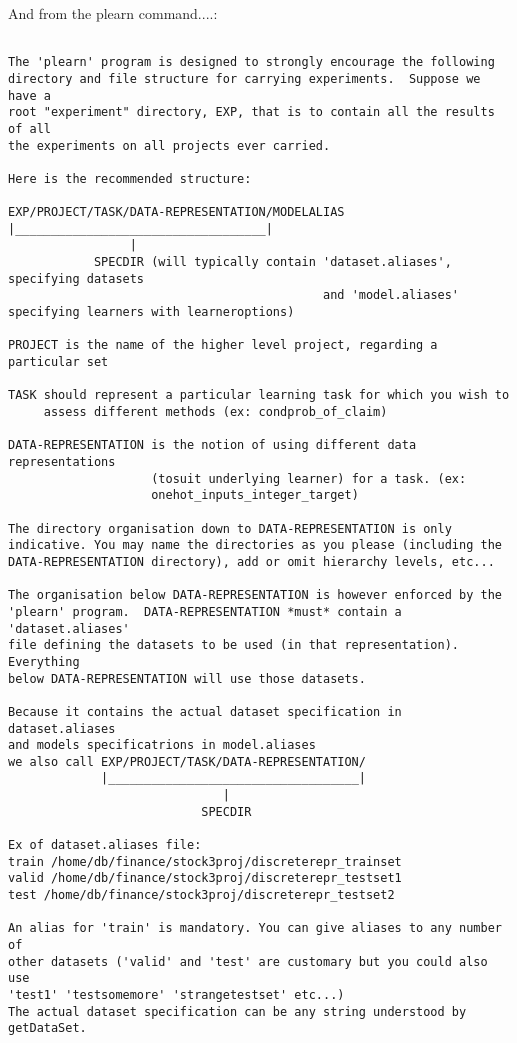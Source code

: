 \documentclass[11pt]{book}
\begin{document}
And from the plearn command....:

\begin{verbatim}

The 'plearn' program is designed to strongly encourage the following
directory and file structure for carrying experiments.  Suppose we have a
root "experiment" directory, EXP, that is to contain all the results of all
the experiments on all projects ever carried.

Here is the recommended structure:

EXP/PROJECT/TASK/DATA-REPRESENTATION/MODELALIAS
|___________________________________|
                 |
            SPECDIR (will typically contain 'dataset.aliases', specifying datasets 
                                            and 'model.aliases' specifying learners with learneroptions)

PROJECT is the name of the higher level project, regarding a particular set

TASK should represent a particular learning task for which you wish to
     assess different methods (ex: condprob_of_claim)

DATA-REPRESENTATION is the notion of using different data representations
                    (tosuit underlying learner) for a task. (ex:
                    onehot_inputs_integer_target)

The directory organisation down to DATA-REPRESENTATION is only
indicative. You may name the directories as you please (including the
DATA-REPRESENTATION directory), add or omit hierarchy levels, etc...

The organisation below DATA-REPRESENTATION is however enforced by the
'plearn' program.  DATA-REPRESENTATION *must* contain a 'dataset.aliases'
file defining the datasets to be used (in that representation). Everything
below DATA-REPRESENTATION will use those datasets. 

Because it contains the actual dataset specification in dataset.aliases 
and models specificatrions in model.aliases
we also call EXP/PROJECT/TASK/DATA-REPRESENTATION/
             |___________________________________|
                              |
                           SPECDIR

Ex of dataset.aliases file:
train /home/db/finance/stock3proj/discreterepr_trainset
valid /home/db/finance/stock3proj/discreterepr_testset1
test /home/db/finance/stock3proj/discreterepr_testset2

An alias for 'train' is mandatory. You can give aliases to any number of
other datasets ('valid' and 'test' are customary but you could also use
'test1' 'testsomemore' 'strangetestset' etc...)
The actual dataset specification can be any string understood by getDataSet.



\end{verbatim}
\end{document}
